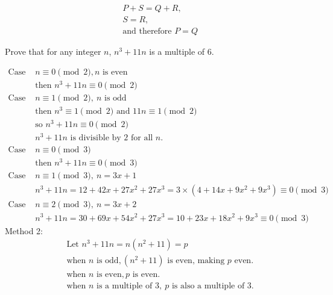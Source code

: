 \documentclass[12pt,answers]{exam}
\begin{document}
\begin{questions}
\begin{solution}
    \[\begin{aligned}
    &P+S = Q+R,\\
    &S = R,\\
    &\text{and therefore } P = Q    
    \end{aligned}\]
\end{solution}
\question Prove that for any integer $n$, $n^3+11n$ is a multiple of 6.
\begin{solution}
\[    \begin{aligned}
        \text{Case 1a: } &n \equiv 0 \pmod{2}, n \text{ is even}\\
        &\text{then } n^3+11n \equiv 0 \pmod{2}\\        
        \text{Case 1b: }&n \equiv 1 \pmod{2},\ n \text{ is odd}\\
        &\text{then } n^3 \equiv 1 \pmod{2} \text{ and } 11n \equiv 1 \pmod{2}\\
        &\text{so } n^3 + 11n \equiv 0 \pmod{2}\\
        &n^3+11n \text{ is divisible by 2 for all }n.\\
        \text{Case 2a: } &n \equiv 0 \pmod{3}\\
        &\text{then } n^3+11n \equiv 0 \pmod{3}\\
        \text{Case 2b: } &n \equiv 1 \pmod{3},\ n=3x+1\\
        &n^3+11n = 12 + 42 x + 27 x^2 + 27 x^3 = 3\times(4 + 14 x + 9 x^2 + 9 x^3) \equiv 0 \pmod{3}\\
        \text{Case 2c: } &n \equiv 2 \pmod{3},\ n=3x+2\\
        &n^3+11n = 30 + 69 x + 54 x^2 + 27 x^3 = 10 + 23 x + 18 x^2 + 9 x^3 \equiv 0 \pmod{3}
    \end{aligned}\]
    Method 2:
    \[\begin{aligned}
        &\text{Let } n^3 + 11n = n(n^2+11) = p\\
        &\text{when } n \text{ is odd}, (n^2+11) \text{ is even, making } p \text{ even.}\\ 
        &\text{when } n \text{ is even}, p \text{ is even.}\\
        &\text{when } n \text{ is a multiple of }3,\ p \text{ is also a multiple of } 3.\\

\end{aligned}\]
\end{solution}
\end{questions}
\end{document}
